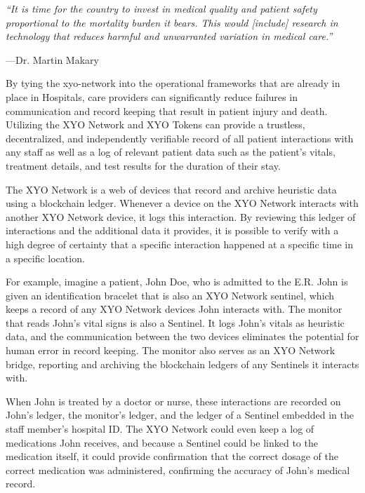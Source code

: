 \documentclass{article}
\begin{document}
\begin{displayquote}\textit{``It is time for the country to invest in medical quality and patient safety proportional to the mortality burden it bears. This would [include] research in technology that reduces harmful and unwarranted variation in medical care.''} \cite{makary-johnshopkins}

\vspace{2mm}
---Dr. Martin Makary
\end{displayquote}

By tying the \Gls{xyo-network} into the operational frameworks that are already in place in Hospitals, care providers can significantly reduce failures in communication and record keeping that result in patient injury and death. Utilizing the XYO Network and XYO Tokens can provide a \gls{trustless}, decentralized, and independently verifiable record of all patient interactions with any staff as well as a log of relevant patient data such as the patient's vitals, treatment details, and test results for the duration of their stay.

The XYO Network is a web of devices that record and archive \gls{heuristic} data using a blockchain ledger. Whenever a device on the XYO Network interacts with another XYO Network device, it logs this interaction. By reviewing this ledger of interactions and the additional data it provides, it is possible to verify with a high degree of \gls{certainty} that a specific interaction happened at a specific time in a specific location.

For example, imagine a patient, John Doe, who is admitted to the E.R. John is given an identification bracelet that is also an XYO Network \Gls{sentinel}, which keeps a record of any XYO Network devices John interacts with. The monitor that reads John's vital signs is also a Sentinel. It logs John's vitals as heuristic data, and the communication between the two devices eliminates the potential for human error in record keeping. The monitor also serves as an XYO Network \Gls{bridge}, reporting and archiving the blockchain ledgers of any Sentinels it interacts with.

When John is treated by a doctor or nurse, these interactions are recorded on John's ledger, the monitor's ledger, and the ledger of a Sentinel embedded in the staff member's hospital ID. The XYO Network could even keep a log of medications John receives, and because a Sentinel could be linked to the medication itself, it could provide confirmation that the correct dosage of the correct medication was administered, confirming the \gls{accuracy} of John's medical record.
\end{document}
